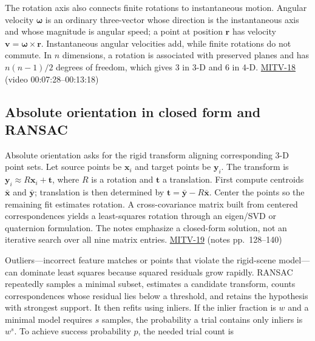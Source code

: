 The rotation axis also connects finite rotations to instantaneous motion. Angular velocity \(\boldsymbol{\omega}\) is an ordinary three-vector whose direction is the instantaneous axis and whose magnitude is angular speed; a point at position \(\mathbf{r}\) has velocity \(\mathbf{v}=\boldsymbol{\omega}\times\mathbf{r}\). Instantaneous angular velocities add, while finite rotations do not commute. In \(n\) dimensions, a rotation is associated with preserved planes and has \(n(n-1)/2\) degrees of freedom, which gives 3 in 3-D and 6 in 4-D. \hyperref[04-visual-computing-ii-ch036-mitv-18---rotation-and-how-to-represent-it-unit-quaternions-the-space-of-rotations]{MITV-18} (video 00:07:28--00:13:18)

\subsection{Absolute orientation in closed form and RANSAC}\label{04-visual-computing-ii-ch032-absolute-orientation-in-closed-form-and-ransac}

Absolute orientation asks for the rigid transform aligning corresponding 3-D point sets. Let source points be \(\mathbf{x}_i\) and target points be \(\mathbf{y}_i\). The transform is \(\mathbf{y}_i\approx R\mathbf{x}_i+\mathbf{t}\), where \(R\) is a rotation and \(\mathbf{t}\) a translation. First compute centroids \(\bar{\mathbf{x}}\) and \(\bar{\mathbf{y}}\); translation is then determined by \(\mathbf{t}=\bar{\mathbf{y}}-R\bar{\mathbf{x}}\). Center the points so the remaining fit estimates rotation. A cross-covariance matrix built from centered correspondences yields a least-squares rotation through an eigen/SVD or quaternion formulation. The notes emphasize a closed-form solution, not an iterative search over all nine matrix entries. \hyperref[04-visual-computing-ii-ch036-mitv-19---absolute-orientation-in-closed-form-outliers-and-robustness-ransac]{MITV-19} (notes pp.~128--140)

Outliers---incorrect feature matches or points that violate the rigid-scene model---can dominate least squares because squared residuals grow rapidly. RANSAC repeatedly samples a minimal subset, estimates a candidate transform, counts correspondences whose residual lies below a threshold, and retains the hypothesis with strongest support. It then refits using inliers. If the inlier fraction is \(w\) and a minimal model requires \(s\) samples, the probability a trial contains only inliers is \(w^s\). To achieve success probability \(p\), the needed trial count is

